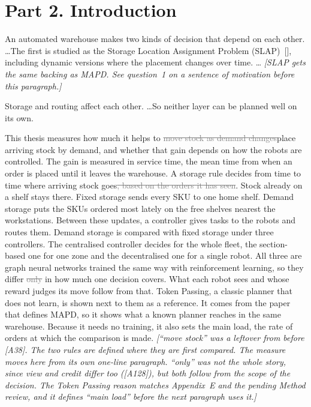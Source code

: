 \documentclass[11pt,a4paper]{article}
\newcommand{\new}[1]{\textcolor{newc}{#1}}
\newcommand{\old}[1]{\textcolor{gray}{\sout{#1}}}
\newcommand{\note}[1]{{\small\itshape [#1]}}
\newcommand{\lab}[1]{\textsf{\footnotesize\detokenize{#1}}}
\newcommand{\citep}[1]{[\lab{#1}]}
\begin{document}
\section*{Part 2. Introduction}

An automated warehouse makes two kinds of decision that depend on each
other. \ldots The first is studied as the Storage Location Assignment
Problem (SLAP)\new{~\citep{reyes2019slap_review}}, including dynamic
versions where the placement changes over time. \ldots
\note{SLAP gets the same backing as MAPD. See question~1 on a sentence of
motivation before this paragraph.}

Storage and routing affect each other. \ldots So neither layer can be
planned well on its own.

This thesis measures how much it helps to \old{move stock as demand
changes}\new{place arriving stock by demand}, and whether that gain depends
on how the robots are controlled. \new{The gain is measured in service time,
the mean time from when an order is placed until it leaves the warehouse.}
A storage rule decides from time to time where arriving stock
goes\old{, based on the orders it has seen}. \new{Stock already on a shelf
stays there. Fixed storage sends every SKU to one home shelf. Demand storage
puts the SKUs ordered most lately on the free shelves nearest the
workstations.} Between these updates, a controller gives tasks to the
robots and routes them. Demand storage is compared with fixed storage under
three controllers. The centralised controller decides for the whole fleet,
the section-based one for one zone and the decentralised one for a single
robot. All three are graph neural networks trained the same way with
reinforcement learning, so they differ \old{only} in how much one decision
covers\new{. What each robot sees and whose reward judges its move follow
from that}. Token Passing, a classic planner that does not learn, is shown
next to them as a reference. \new{It comes from the paper that defines MAPD,
so it shows what a known planner reaches in the same warehouse. Because it
needs no training, it also sets the main load, the rate of orders at which
the comparison is made.}
\note{``move stock'' was a leftover from before [A38]. The two rules are
defined where they are first compared. The measure moves here from its own
one-line paragraph. ``only'' was not the whole story, since view and credit
differ too ([A128]), but both follow from the scope of the decision. The
Token Passing reason matches Appendix~E and the pending Method review, and
it defines ``main load'' before the next paragraph uses it.}
\end{document}
